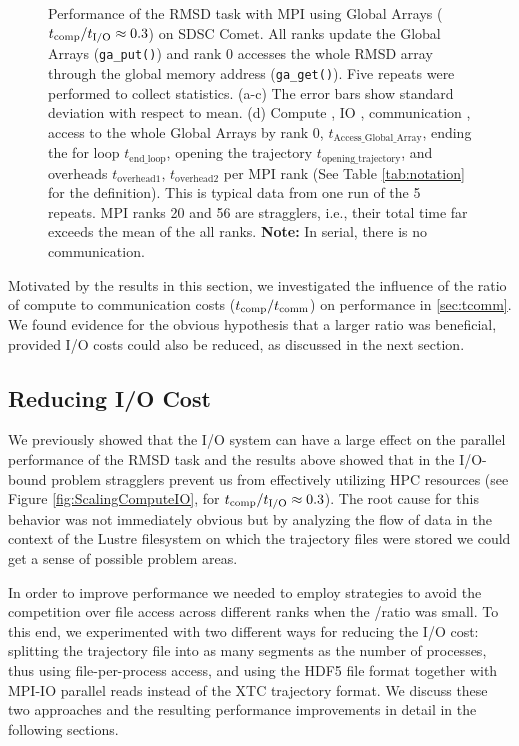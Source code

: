 \begin{figure}[ht!]
\caption{Performance of the RMSD task with MPI using Global Arrays (${t}_{\text{comp}}/{t}_{\text{I/O}} \approx 0.3$) on SDSC Comet.
All ranks update the Global Arrays (\texttt{ga\_put()}) and rank 0 accesses the whole RMSD array through the global memory address (\texttt{ga\_get()}).
Five repeats were performed to collect statistics. (a-c) The error bars show standard deviation with respect to mean. 
(d) Compute \tcomp, IO \tIO, communication \tcomm, access to the whole Global Arrays by rank 0, $t_{\text{Access\_Global\_Array}}$, ending the for loop $t_{\text{end\_loop}}$,
  opening the trajectory $t_{\text{opening\_trajectory}}$, and overheads $t_{\text{overhead1}}$, $t_{\text{overhead2}}$ per MPI rank (See Table \ref{tab:notation} for the definition). 
  This is typical data from one run of the 5 repeats. MPI ranks 20 and 56 are stragglers, i.e., 
their total time far exceeds the mean of the all ranks. \textbf{Note:} In serial, there is no communication.}
\label{fig:MPIwithIO-ga4py}
\end{figure}

Motivated by the results in this section, we investigated the influence of the ratio of compute to communication costs (${t}_{\text{comp}}/t_{\text{comm}}$) on performance in \ref{sec:tcomm}.
We found evidence for the obvious hypothesis that a larger ratio was beneficial, provided I/O costs could also be reduced, as discussed in the next section.

\subsection{Reducing I/O Cost}
\label{sec:I/O}

We previously showed that the I/O system can have a large effect on the parallel performance of the RMSD task \cite{Khoshlessan:2017ab} and the results above showed that in the I/O-bound problem stragglers prevent us from effectively utilizing HPC resources (see Figure \ref{fig:ScalingComputeIO}, for ${t}_{\text{comp}}/{t}_{\text{I/O}} \approx 0.3$).
The root cause for this behavior was not immediately obvious but by analyzing the flow of data in the context of the Lustre filesystem on which the trajectory files were stored  we could get a sense of possible problem areas.

In order to improve performance we needed to employ strategies to avoid the competition over file access across different ranks when the \tcomp/\tIO ratio was small.
To this end, we experimented with two different ways for reducing the I/O cost:
splitting the trajectory file into as many segments as the number of processes, thus using file-per-process access, and using the HDF5 file format together with MPI-IO parallel reads instead of the XTC trajectory format.
We discuss these two approaches and the resulting performance improvements in detail in the following sections.

